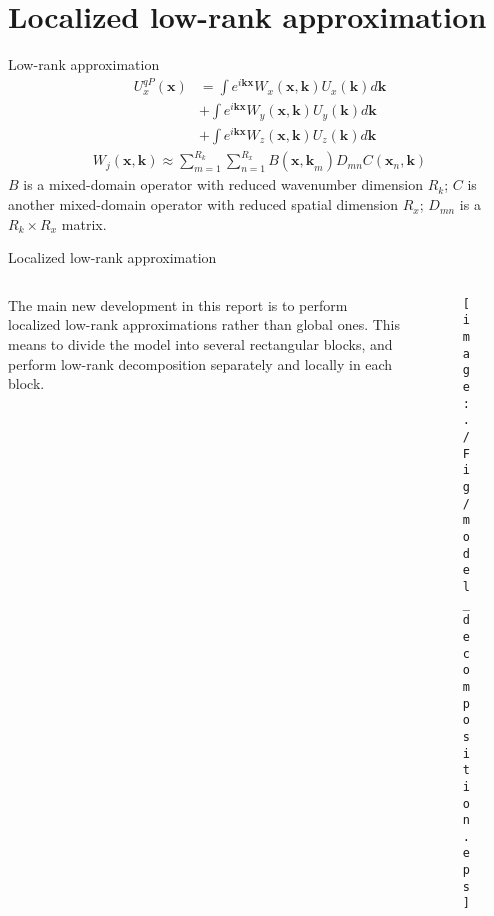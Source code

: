 \documentclass[aspectratio=43]{beamer}
\begin{document}
\section{Localized low-rank approximation}
\begin{frame}{Low-rank approximation}
\begin{eqnarray*}
U^{qP}_x(\mathbf{x})&=\int e^{i\mathbf{kx}}W_x(\mathbf{x,k})U_x(\mathbf{k})d\mathbf{k}\\
                    &+\int e^{i\mathbf{kx}}W_y(\mathbf{x,k})U_y(\mathbf{k})d\mathbf{k}\\
                    &+\int e^{i\mathbf{kx}}W_z(\mathbf{x,k})U_z(\mathbf{k})d\mathbf{k}
\end{eqnarray*}
\begin{eqnarray*}
W_j(\mathbf{x,k})\approx \sum^{R_k}_{m=1}\sum^{R_x}_{n=1}B(\mathbf{x,k}_{m})D_{m n}C(\mathbf{x}_{n},\mathbf{k})
\end{eqnarray*}
$B$ is a mixed-domain operator with reduced wavenumber dimension $R_k$; $C$ is another mixed-domain operator with reduced spatial dimension $R_x$; $D_{m n}$ is a $R_k \times R_x$ matrix. 
\end{frame}
\begin{frame}{Localized low-rank approximation}

\begin{columns}
  \begin{column}{0.50\textwidth}
The main new development in this report is to perform localized low-rank approximations rather than global ones. This means to divide the model into several rectangular blocks, and perform low-rank decomposition separately and locally in each block. 
  \end{column}
  \begin{column}{0.50\textwidth}
  \begin{figure}
  \texttt{[image: ./Fig/model\_decomposition.eps]}
  \end{figure}
  \end{column}
\end{columns}

\end{frame}
\end{document}
